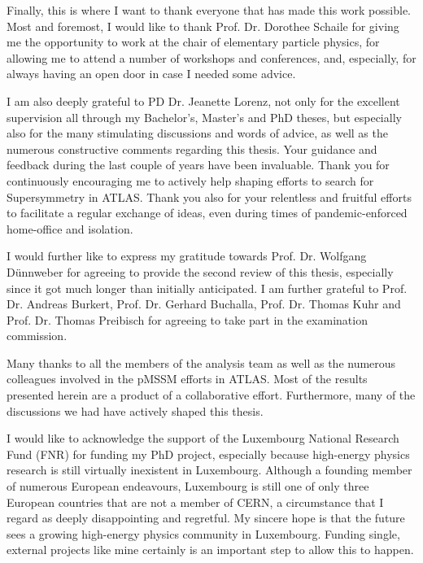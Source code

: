 
\begin{acknowledgements}[Acknowledgements]  

Finally, this is where I want to thank everyone that has made this work possible. Most and foremost, I would like to thank Prof.\@\xspace Dr.\@\xspace Dorothee Schaile for giving me the opportunity to work at the chair of elementary particle physics, for allowing me to attend a number of workshops and conferences, and, especially, for always having an open door in case I needed some advice.

I am also deeply grateful to PD\@\xspace Dr.\@\xspace Jeanette Lorenz, not only for the excellent supervision all through my Bachelor's, Master's and PhD theses, but especially also for the many stimulating discussions and words of advice, as well as the numerous constructive comments regarding this thesis. Your guidance and feedback during the last couple of years have been invaluable. Thank you for continuously encouraging me to actively help shaping efforts to search for Supersymmetry in ATLAS. Thank you also for your relentless and fruitful efforts to facilitate a regular exchange of ideas, even during times of pandemic-enforced home-office and isolation.

I would further like to express my gratitude towards Prof.\@\xspace Dr.\@\xspace Wolfgang D\"unnweber for agreeing to provide the second review of this thesis, especially since it got much longer than initially anticipated. I am further grateful to Prof.\@\xspace Dr.\@\xspace Andreas Burkert, Prof.\@\xspace Dr.\@\xspace Gerhard Buchalla, Prof.\@\xspace Dr.\@\xspace Thomas Kuhr and Prof.\@\xspace Dr.\@\xspace Thomas Preibisch for agreeing to take part in the examination commission.

Many thanks to all the members of the \onelepton analysis team as well as the numerous colleagues involved in the pMSSM efforts in ATLAS. Most of the results presented herein are a product of a collaborative effort. Furthermore, many of the discussions we had have actively shaped this thesis.

I would like to acknowledge the support of the Luxembourg National Research Fund (FNR) for funding my PhD project, especially because high-energy physics research is still virtually inexistent in Luxembourg. Although a founding member of numerous European endeavours, Luxembourg is still one of only three European countries that are not a member of CERN, a circumstance that I regard as deeply disappointing and regretful. My sincere hope is that the future sees a growing high-energy physics community in Luxembourg. Funding single, external projects like mine certainly is an important step to allow this to happen.


\end{acknowledgements}
